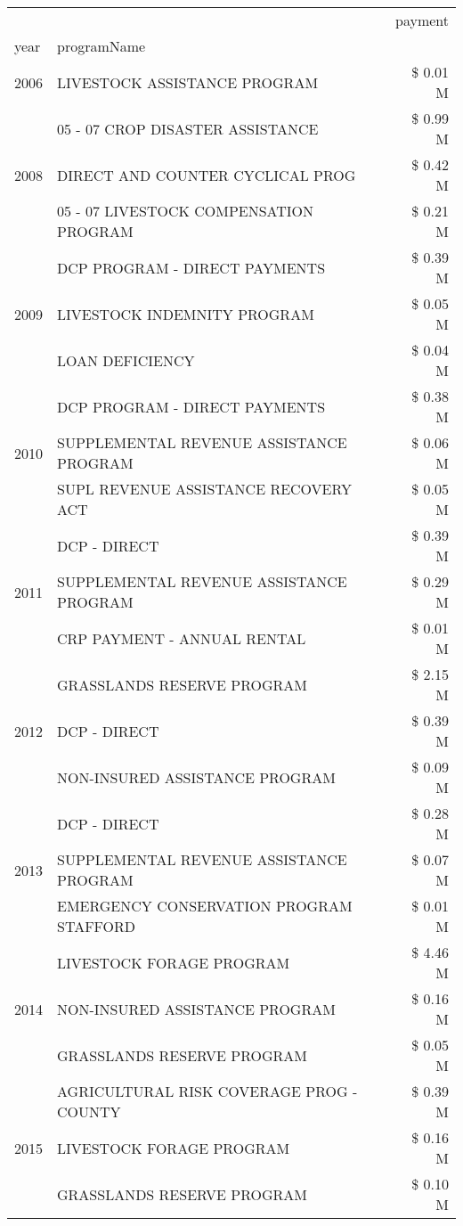 \begin{tabular}{llr}
\toprule
 &  & payment \\
year & programName &  \\
\midrule
2006 & LIVESTOCK ASSISTANCE PROGRAM & \$ 0.01 M \\
\cline{1-3}
\multirow[t]{3}{*}{2008} & 05 - 07 CROP DISASTER ASSISTANCE & \$ 0.99 M \\
 & DIRECT AND COUNTER CYCLICAL PROG & \$ 0.42 M \\
 & 05 - 07 LIVESTOCK COMPENSATION PROGRAM & \$ 0.21 M \\
\cline{1-3}
\multirow[t]{3}{*}{2009} & DCP PROGRAM - DIRECT PAYMENTS & \$ 0.39 M \\
 & LIVESTOCK INDEMNITY PROGRAM & \$ 0.05 M \\
 & LOAN DEFICIENCY & \$ 0.04 M \\
\cline{1-3}
\multirow[t]{3}{*}{2010} & DCP PROGRAM - DIRECT PAYMENTS & \$ 0.38 M \\
 & SUPPLEMENTAL REVENUE ASSISTANCE PROGRAM & \$ 0.06 M \\
 & SUPL REVENUE ASSISTANCE RECOVERY ACT & \$ 0.05 M \\
\cline{1-3}
\multirow[t]{3}{*}{2011} & DCP - DIRECT & \$ 0.39 M \\
 & SUPPLEMENTAL REVENUE ASSISTANCE PROGRAM & \$ 0.29 M \\
 & CRP PAYMENT - ANNUAL RENTAL & \$ 0.01 M \\
\cline{1-3}
\multirow[t]{3}{*}{2012} & GRASSLANDS RESERVE PROGRAM & \$ 2.15 M \\
 & DCP - DIRECT & \$ 0.39 M \\
 & NON-INSURED ASSISTANCE PROGRAM & \$ 0.09 M \\
\cline{1-3}
\multirow[t]{3}{*}{2013} & DCP - DIRECT & \$ 0.28 M \\
 & SUPPLEMENTAL REVENUE ASSISTANCE PROGRAM & \$ 0.07 M \\
 & EMERGENCY CONSERVATION PROGRAM STAFFORD & \$ 0.01 M \\
\cline{1-3}
\multirow[t]{3}{*}{2014} & LIVESTOCK FORAGE PROGRAM & \$ 4.46 M \\
 & NON-INSURED ASSISTANCE PROGRAM & \$ 0.16 M \\
 & GRASSLANDS RESERVE PROGRAM & \$ 0.05 M \\
\cline{1-3}
\multirow[t]{3}{*}{2015} & AGRICULTURAL RISK COVERAGE PROG - COUNTY & \$ 0.39 M \\
 & LIVESTOCK FORAGE PROGRAM & \$ 0.16 M \\
 & GRASSLANDS RESERVE PROGRAM & \$ 0.10 M \\

\end{tabular}
